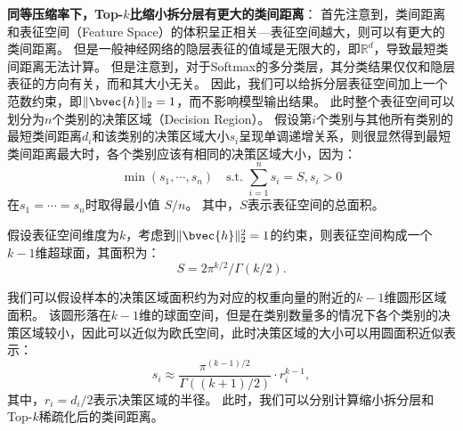 \textbf{同等压缩率下，Top-$k$比缩小拆分层有更大的类间距离}：
首先注意到，类间距离和表征空间（Feature Space）的体积呈正相关---表征空间越大，则可以有更大的类间距离。
%
但是一般神经网络的隐层表征的值域是无限大的，即$\mathbb R^d$，导致最短类间距离无法计算。
%
但是注意到，对于Softmax的多分类层，其分类结果仅仅和隐层表征的方向有关，而和其大小无关。
%
因此，我们可以给拆分层表征空间加上一个范数约束，即$\Vert \bvec{h} \Vert_2 = 1$，而不影响模型输出结果。
%
此时整个表征空间可以划分为$n$个类别的决策区域（Decision Region）。
假设第$i$个类别与其他所有类别的最短类间距离$d_i$和该类别的决策区域大小$s_i$呈现单调递增关系，则很显然得到最短类间距离最大时，各个类别应该有相同的决策区域大小，因为：
\begin{equation}
    \min (s_1, \cdots, s_n) \quad \text{s.t. } {\sum_{i=1}^n s_i = S, s_i > 0}
\end{equation}
在$s_1 = \cdots = s_n$时取得最小值 $S/n$。
其中，$S$表示表征空间的总面积。

假设表征空间维度为$k$，考虑到$\Vert \bvec{h} \Vert^2_2 = 1$的约束，则表征空间构成一个$k-1$维超球面，其面积为：
\begin{equation}
    S = 2\pi^{k/2}/\Gamma(k/2).
\end{equation}



我们可以假设样本的决策区域面积约为对应的权重向量的附近的$k-1$维圆形区域面积。
该圆形落在$k-1$维的球面空间，但是在类别数量多的情况下各个类别的决策区域较小，因此可以近似为欧氏空间，此时决策区域的大小可以用圆面积近似表示：
\begin{equation}
    s_i \approx \dfrac{\pi^{(k-1)/2}}{\Gamma((k+1)/2)} \cdot r_i^{k-1},
\end{equation}
其中，$r_i = d_i/2$表示决策区域的半径。
%
此时，我们可以分别计算缩小拆分层和Top-$k$稀疏化后的类间距离。



